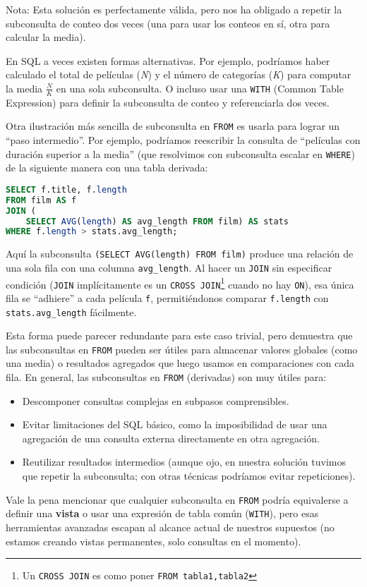 \documentclass[12pt,a4paper]{article}
\begin{document}
Nota: Esta solución es perfectamente válida, pero nos ha obligado a repetir la subconsulta de conteo dos veces (una para usar los conteos en sí, otra para calcular la media).


En SQL a veces existen formas alternativas.
%
Por ejemplo, podríamos haber calculado el total de películas (\textit{N}) y el número de categorías (\textit{K}) para computar la media $\frac{N}{K}$ en una sola subconsulta.
%
O incluso usar una \texttt{WITH} (Common Table Expression) para definir la subconsulta de conteo y referenciarla dos veces.


Otra ilustración más sencilla de subconsulta en \texttt{FROM} es usarla para lograr un “paso intermedio”.
%
Por ejemplo, podríamos reescribir la consulta de “películas con duración superior a la media” (que resolvimos con subconsulta escalar en \texttt{WHERE}) de la siguiente manera con una tabla derivada: 


\begin{lstlisting}[language=SQL]
SELECT f.title, f.length
FROM film AS f
JOIN (
	SELECT AVG(length) AS avg_length FROM film) AS stats
WHERE f.length > stats.avg_length;
\end{lstlisting}


Aquí la subconsulta \texttt{(SELECT AVG(length) FROM film)} produce una relación de una sola fila con una columna \texttt{avg\_length}.
%
Al hacer un \texttt{JOIN} sin especificar condición (\texttt{JOIN} implícitamente es un \texttt{CROSS JOIN}\footnote{Un \texttt{CROSS JOIN} es como poner \texttt{FROM tabla1,tabla2}} cuando no hay \texttt{ON}), esa única fila se “adhiere” a cada película \texttt{f}, permitiéndonos comparar \texttt{f.length} con \texttt{stats.avg\_length} fácilmente.

Esta forma puede parecer redundante para este caso trivial, pero demuestra que las subconsultas en \texttt{FROM} pueden ser útiles para almacenar valores globales (como una media) o resultados agregados que luego usamos en comparaciones con cada fila.
%
En general, las subconsultas en \texttt{FROM} (derivadas) son muy útiles para:



\begin{itemize}
\item Descomponer consultas complejas en subpasos comprensibles.
\item Evitar limitaciones del SQL básico, como la imposibilidad de usar una agregación de una consulta externa directamente en otra agregación.
\item Reutilizar resultados intermedios (aunque ojo, en nuestra solución tuvimos que repetir la subconsulta; con otras técnicas podríamos evitar repeticiones).
\end{itemize} 
Vale la pena mencionar que cualquier subconsulta en \texttt{FROM} podría equivalerse a definir una \textbf{vista} o usar una expresión de tabla común (\texttt{WITH}), pero esas herramientas avanzadas escapan al alcance actual de nuestros supuestos (no estamos creando vistas permanentes, solo consultas en el momento). 
\end{document}
